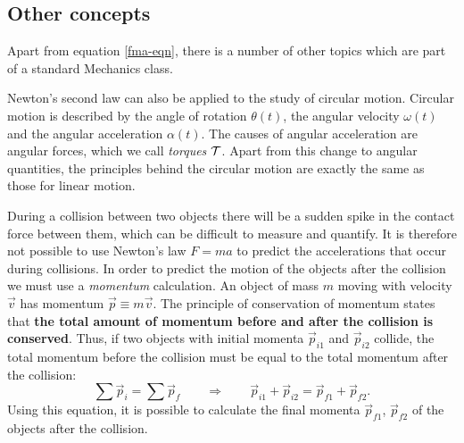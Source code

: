 \vspace{-3mm}
\subsection{Other concepts}

Apart from equation \eqref{fma-eqn}, there is a number of other topics which are part of a standard Mechanics class. 

Newton's second law can also be applied to the study of circular motion.
Circular motion is described by the angle of rotation $\theta(t)$, 
the angular velocity $\omega(t)$ and the angular acceleration $\alpha(t)$.
The causes of angular acceleration are angular forces, which we call \emph{torques} $\mathcal{T}$.
Apart from this change to angular quantities, the principles behind the circular motion 
are exactly the same as those for linear motion.





During a collision between two objects there will be a sudden spike in the contact force between them,
which can be difficult to measure and quantify.
It is therefore not possible to use Newton's law $F=ma$ to predict the accelerations that occur during collisions.
In order to predict the motion of the objects after the collision we must use a \emph{momentum} calculation.
An object of mass $m$ moving with velocity $\vec{v}$ has momentum $\vec{p}\equiv m\vec{v}$.
The principle of conservation of momentum states that {\bf the total amount of momentum before and
after the collision is conserved}. Thus, if two objects with initial momenta $\vec{p}_{i1}$ and $\vec{p}_{i2}$ collide,
the total momentum before the collision must be equal to the total momentum after the collision:
\[
	\sum \vec{p}_i = \sum \vec{p}_f 	
	\qquad
	\Rightarrow
	\qquad
	\vec{p}_{i1} + \vec{p}_{i2} 
		=
		\vec{p}_{f1} + \vec{p}_{f2}.
\]
Using this equation, it is possible to calculate the final momenta $\vec{p}_{f1}$, $\vec{p}_{f2}$
of the objects after the collision. 


